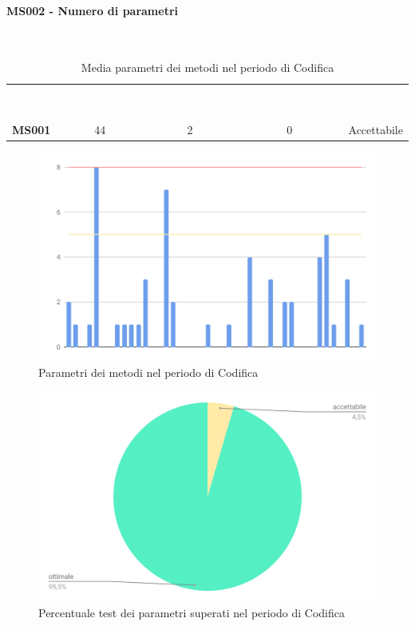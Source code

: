 \paragraph{MS002 - Numero di parametri}\mbox{}\\[0,3cm]
    \begin{table}[H]
        \centering
        \begin{tabular}{ccccc}
            \rowcolor{greySWEight}
            \textcolor{white}{\textbf{Codice}} &
            \textcolor{white}{\textbf{File analizzati}} &
            \textcolor{white}{\textbf{[5,8] parametri}}&
            \textcolor{white}{\textbf{8 o più parametri}}&
            \textcolor{white}{\textbf{Riscontro}}\\
            \textbf{MS001} & 44 & 2 & 0 & \textcolor{YellowOrange}{Accettabile}\\
        \end{tabular}
        \caption{Media parametri dei metodi nel periodo di Codifica}
    \end{table}
    \begin{figure}[H]
        \centering
        \includegraphics[width=0.7\linewidth]{sez/App_Esito/Qualifica/graph/parametriPerMetodo.pdf}
        \caption{Parametri dei metodi nel periodo di Codifica}
    \end{figure}
    \begin{figure}[H]
        \centering
        \includegraphics[width=0.7\linewidth]{sez/App_Esito/Qualifica/graph/parametriPerMetodoTorta.pdf}
        \caption{Percentuale test dei parametri superati nel periodo di Codifica}
    \end{figure}

